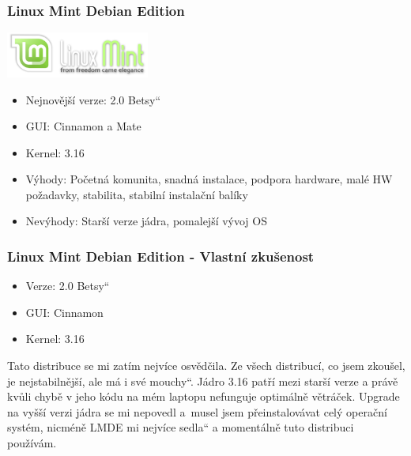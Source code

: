\documentclass{beamer}
\newcommand{\czuv}[1]{\quotedblbase #1\textquotedblleft}
\begin{document}
  \begin{frame}
    \frametitle{Linux Mint Debian Edition}
    \includegraphics[height=1.5cm]{mint.png}
      \begin{itemize}
	\item Nejnovější verze: 2.0 \czuv{Betsy}
	\item GUI: Cinnamon a Mate
	\item Kernel: 3.16
	\item Výhody: Početná komunita, snadná instalace, podpora hardware, malé HW požadavky, stabilita, stabilní instalační balíky
	\item Nevýhody: Starší verze jádra, pomalejší vývoj OS
      \end{itemize}
  \end{frame}
  \begin{frame}
    \frametitle{Linux Mint Debian Edition - Vlastní zkušenost}
      \begin{itemize}
	\item Verze: 2.0 \czuv{Betsy}
	\item GUI: Cinnamon
	\item Kernel: 3.16
      \end{itemize}
      Tato distribuce se mi zatím nejvíce osvědčila. Ze všech distribucí, co jsem zkoušel,
      je nejstabilnější, ale má i své \czuv{mouchy}. Jádro 3.16 patří mezi starší verze
      a právě kvůli chybě v jeho kódu na mém laptopu nefunguje optimálně větráček. Upgrade na vyšší verzi
      jádra se mi nepovedl a~musel jsem přeinstalovávat celý operační systém, nicméně LMDE
      mi nejvíce \czuv{sedla} a momentálně tuto distribuci používám.
  \end{frame}
\end{document}
